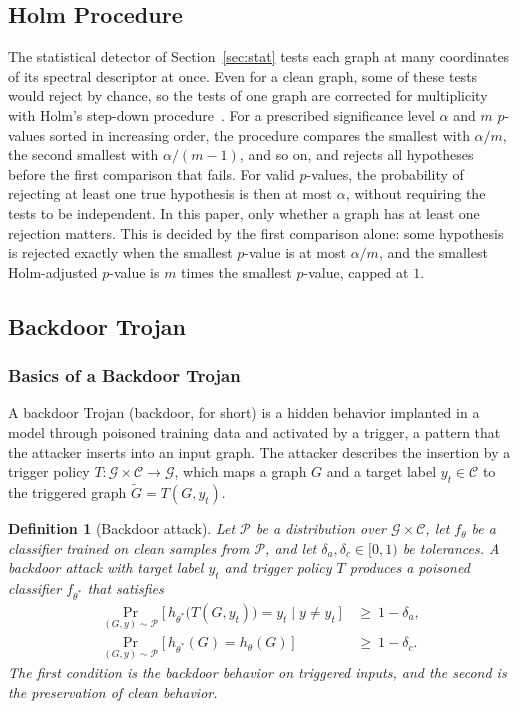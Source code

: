 \documentclass[journal]{IEEEtran}
\newcommand{\calG}{\mathcal{G}}         %
\newcommand{\calC}{\mathcal{C}}         %
\newtheorem{definition}{Definition}
\begin{document}
\subsection{Holm Procedure}\label{sec:holm}
The statistical detector of Section~\ref{sec:stat} tests each graph at many
coordinates of its spectral descriptor at once. Even for a clean graph, some of
these tests would reject by chance, so the tests of one graph are corrected for
multiplicity with Holm's step-down procedure~\cite{holm1979}. For a prescribed
significance level $\alpha$ and $m$ $p$-values sorted in increasing order, the
procedure compares the smallest with $\alpha/m$, the second smallest with
$\alpha/(m-1)$, and so on, and rejects all hypotheses before the first
comparison that fails. For valid $p$-values, the
probability of rejecting at least one true hypothesis is then at most $\alpha$,
without requiring the tests to be independent. In this paper, only whether a
graph has at least one rejection matters. This is decided by the first
comparison alone: some hypothesis is rejected exactly when the smallest
$p$-value is at most $\alpha/m$, and the smallest Holm-adjusted $p$-value is
$m$ times the smallest $p$-value, capped at $1$.

\subsection{Backdoor Trojan}
\subsubsection{Basics of a Backdoor Trojan}
A backdoor Trojan (backdoor, for short) is a hidden behavior implanted in a
model through poisoned training data and activated by a trigger, a pattern
that the attacker inserts into an input graph. The attacker describes the
insertion by a trigger policy $T\colon\calG\times\calC\to\calG$, which maps a
graph $G$ and a target label $y_t\in\calC$ to the triggered graph
$\tilde G=T(G,y_t)$.

\begin{definition}[Backdoor attack]
Let $\mathcal{P}$ be a distribution over $\calG\times\calC$, let $f_\theta$ be a
classifier trained on clean samples from $\mathcal{P}$, and let
$\delta_a,\delta_c\in[0,1)$ be tolerances. A backdoor attack with target label
$y_t$ and trigger policy $T$ produces a poisoned classifier $f_{\theta^*}$ that
satisfies
\begin{align*}
\Pr_{(G,y)\sim\mathcal{P}}\bigl[\,h_{\theta^*}\bigl(T(G,y_t)\bigr)=y_t
  \;\big|\; y\neq y_t \,\bigr] &\ \ge\ 1-\delta_a,\\
\Pr_{(G,y)\sim\mathcal{P}}\bigl[\,h_{\theta^*}(G)=h_{\theta}(G)\,\bigr]
  &\ \ge\ 1-\delta_c .
\end{align*}
The first condition is the backdoor behavior on triggered inputs, and the
second is the preservation of clean behavior.
\end{definition}
\end{document}
